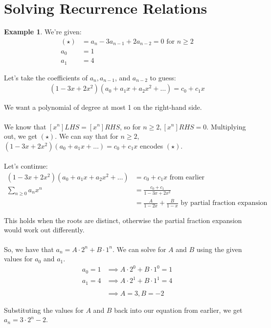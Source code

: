 \documentclass[]{article}
\theoremstyle{definition}
\newtheorem{ex}{Example}[section]
\begin{document}
	\section{Solving Recurrence Relations}
		\begin{ex}
			We're given:
			\begin{align*}
				(\star) &= a_n - 3a_{n - 1} + 2a_{n - 2} = 0 \text{ for } n \ge 2 \\
				a_0 &= 1 \\
				a_1 &= 4
			\end{align*}

			Let's take the coefficients of $a_n, a_{n - 1}$, and $a_{n - 2}$ to guess:
			\begin{align*}
				(1 - 3x + 2x^2)(a_0 + a_1x + a_2x^2 + \ldots) =c_0 + c_1x
			\end{align*}

			We want a polynomial of degree at most 1 on the right-hand side.
			\\ \\
			We know that $[x^n] LHS = [x^n] RHS$, so for $n \ge 2, [x^n]RHS = 0$. Multiplying out, we get $(\star)$. We can say that for $n \ge 2$, $(1 - 3x + 2x^2)(a_0 + a_1x + \ldots) = c_0 + c_1x$ encodes $(\star)$.
			\\ \\
			Let's continue:
			\begin{align*}
				(1 - 3x + 2x^2)(a_0 + a_1x + a_2x^2 + \ldots) &= c_0 + c_1x \text{ from earlier} \\
				\sum_{n \ge 0} a_n x^n &= \frac{c_0 + c_1}{1 - 3x + 2x^2} \\
				&= \frac{A}{1 - 2x} + \frac{B}{1 - x} \text{ by partial fraction expansion}
			\end{align*}

			This holds when the roots are distinct, otherwise the partial fraction expansion would work out differently.
			\\ \\
			So, we have that $a_n = A \cdot 2^n + B \cdot 1^n$. We can solve for $A$ and $B$ using the given values for $a_0$ and $a_1$.
			\begin{align*}
				a_0 = 1 &\implies A \cdot 2^0 + B \cdot 1^0 = 1 \\
				a_1 = 4 &\implies A \cdot 2^1 + B \cdot 1^1 = 4 \\ \\
				&\implies A = 3, B = -2
			\end{align*}

			Substituting the values for $A$ and $B$ back into our equation from earlier, we get $a_n = 3 \cdot 2^n - 2$.
		\end{ex}
\end{document}
